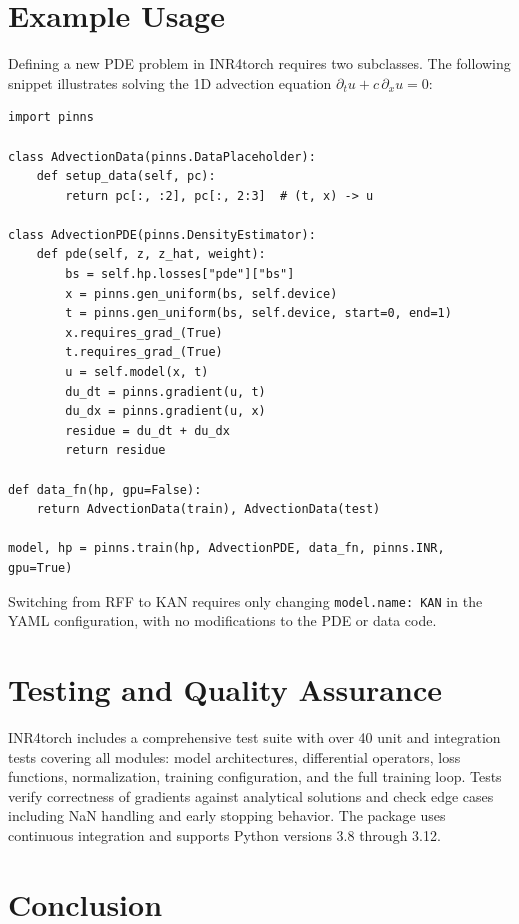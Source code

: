 \documentclass[11pt,a4paper]{article}
\begin{document}
\section{Example Usage}

Defining a new PDE problem in INR4torch requires two subclasses. The following snippet illustrates solving the 1D advection equation $\partial_t u + c \, \partial_x u = 0$:

\begin{lstlisting}
import pinns

class AdvectionData(pinns.DataPlaceholder):
    def setup_data(self, pc):
        return pc[:, :2], pc[:, 2:3]  # (t, x) -> u

class AdvectionPDE(pinns.DensityEstimator):
    def pde(self, z, z_hat, weight):
        bs = self.hp.losses["pde"]["bs"]
        x = pinns.gen_uniform(bs, self.device)
        t = pinns.gen_uniform(bs, self.device, start=0, end=1)
        x.requires_grad_(True)
        t.requires_grad_(True)
        u = self.model(x, t)
        du_dt = pinns.gradient(u, t)
        du_dx = pinns.gradient(u, x)
        residue = du_dt + du_dx
        return residue

def data_fn(hp, gpu=False):
    return AdvectionData(train), AdvectionData(test)

model, hp = pinns.train(hp, AdvectionPDE, data_fn, pinns.INR, gpu=True)
\end{lstlisting}

Switching from RFF to KAN requires only changing \texttt{model.name: KAN} in the YAML configuration, with no modifications to the PDE or data code.

\section{Testing and Quality Assurance}

INR4torch includes a comprehensive test suite with over 40 unit and integration tests covering all modules: model architectures, differential operators, loss functions, normalization, training configuration, and the full training loop. Tests verify correctness of gradients against analytical solutions and check edge cases including NaN handling and early stopping behavior. The package uses continuous integration and supports Python versions 3.8 through 3.12.

\section{Conclusion}
\end{document}
